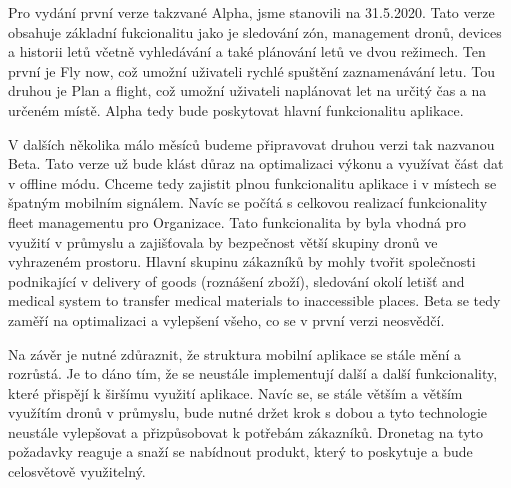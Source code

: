 Pro vydání první verze takzvané Alpha, jsme stanovili na 31.5.2020.
Tato verze obsahuje základní fukcionalitu jako je sledování zón, management dronů, devices a historii letů včetně vyhledávání a také plánování letů ve dvou režimech.
Ten první je Fly now, což umožní uživateli rychlé spuštění zaznamenávání letu.
Tou druhou je Plan a flight, což umožní uživateli naplánovat let na určitý čas a na určeném místě.
Alpha tedy bude poskytovat hlavní funkcionalitu aplikace.

V dalších několika málo měsíců budeme připravovat druhou verzi tak nazvanou Beta.
Tato verze už bude klást důraz na optimalizaci výkonu a využívat část dat v offline módu.
Chceme tedy zajistit plnou funkcionalitu aplikace i v místech se špatným mobilním signálem.
Navíc se počítá s celkovou realizací funkcionality fleet managementu pro Organizace.
Tato funkcionalita by byla vhodná pro využití v průmyslu a zajišťovala by bezpečnost větší skupiny dronů ve vyhrazeném prostoru.
Hlavní skupinu zákazníků by mohly tvořit společnosti podnikající v delivery of goods (roznášení zboží), sledování okolí letišť and medical system to transfer medical materials to inaccessible places.
Beta se tedy zaměří na optimalizaci a vylepšení všeho, co se v první verzi neosvědčí.

Na závěr je nutné zdůraznit, že struktura mobilní aplikace se stále mění a rozrůstá.
Je to dáno tím, že se neustále implementují další a další funkcionality, které přispějí k širšímu využití aplikace.
Navíc se, se stále větším a větším využítím dronů v průmyslu, bude nutné držet krok s dobou a tyto technologie neustále vylepšovat a přizpůsobovat k potřebám zákazníků.
Dronetag na tyto požadavky reaguje a snaží se nabídnout produkt, který to poskytuje a bude celosvětově využitelný.
